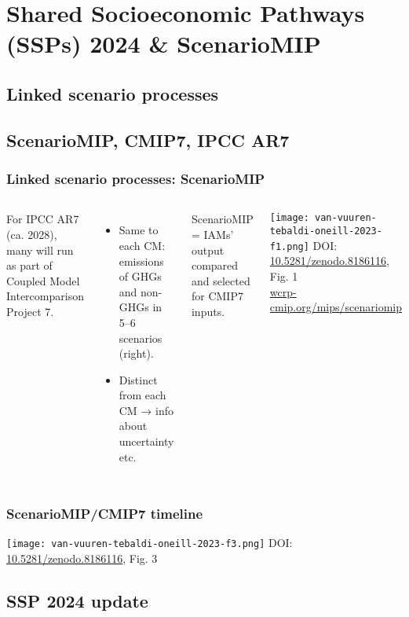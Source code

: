 \documentclass[12pt,aspectratio=169]{beamer}
\begin{document}
\section{Shared Socioeconomic Pathways (SSPs) 2024 \& ScenarioMIP}

\subsection{Linked scenario processes}
\subsection{ScenarioMIP, CMIP7, IPCC AR7}

\begin{frame}
\frametitle{Linked scenario processes: ScenarioMIP}

\begin{columns}
\column[T]{0.425\paperwidth}
For IPCC AR7 (ca. 2028), many  will run as part of Coupled Model Intercomparison Project 7.
\begin{itemize}
  \item Same  to each CM: emissions of GHGs and non-GHGs in 5–6 scenarios (right).
  \item Distinct  from each CM → info about uncertainty etc.
\end{itemize}

\bigskip
ScenarioMIP = IAMs' output compared and selected for CMIP7 inputs.

\column[T]{0.425\paperwidth}
\texttt{[image: van-vuuren-tebaldi-oneill-2023-f1.png]}
DOI: \href{https://doi.org/10.5281/zenodo.8186116}{10.5281/zenodo.8186116}, Fig. 1\\
\href{https://wcrp-cmip.org/mips/scenariomip/}{wcrp-cmip.org/mips/scenariomip}
\end{columns}

\end{frame}

\begin{frame}
\frametitle{ScenarioMIP/CMIP7 timeline}
\texttt{[image: van-vuuren-tebaldi-oneill-2023-f3.png]}
DOI: \href{https://doi.org/10.5281/zenodo.8186116}{10.5281/zenodo.8186116}, Fig. 3
\end{frame}

\subsection{SSP 2024 update}
\end{document}
